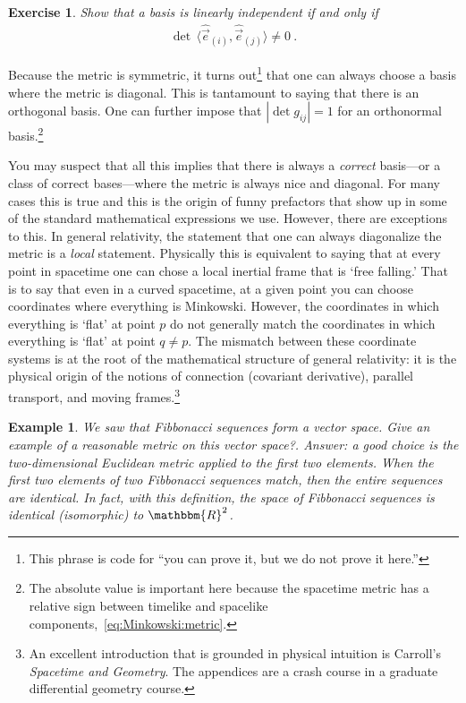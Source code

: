 \documentclass[
  11pt,
	colorful,
	raggedright,
]{tufte-style-thesis-flip}
\newtheorem{exercise}{Exercise}[section]
\newtheorem{example}{Example}[section]
\begin{document}
\begin{exercise}
Show that a basis is linearly independent if and only if
\begin{align}
\det\,\langle \hat{\vec{e}}_{(i)}, \hat{\vec{e}}_{(j)} \rangle \neq 0 \ .  
\end{align}
\end{exercise}
Because the metric is symmetric, it turns out\footnote{This phrase is code for ``you can prove it, but we do not prove it here.''} that one can always choose a basis where the metric is diagonal. This is tantamount to saying that there is an orthogonal basis. One can further impose that $|\det g_{ij}| = 1$ for an orthonormal basis.\footnote{The absolute value is important here because the  spacetime metric has a relative sign between timelike and spacelike components,~\eqref{eq:Minkowski:metric}.}

You may suspect that all this implies that there is always a \emph{correct} basis---or a class of correct bases---where the metric is always nice and diagonal. For many cases this is true and this is the origin of funny prefactors that show up in some of the standard mathematical expressions we use. However, there are exceptions to this. In general relativity, the statement that one can always diagonalize the metric is a \emph{local} statement. Physically this is equivalent to saying that at every point in spacetime one can chose a local inertial frame that is `free falling.' That is to say that even in a curved spacetime, at a given point you can choose coordinates where everything is Minkowski. However, the coordinates in which everything is `flat' at point $p$ do not generally match the coordinates in which everything is `flat' at point $q\neq p$. The mismatch between these coordinate systems is at the root of the mathematical structure of general relativity: it is the physical origin of the notions of connection (covariant derivative), parallel transport, and moving frames.\footnote{An excellent introduction that is grounded in physical intuition is Carroll's \emph{Spacetime and Geometry}. The appendices are a crash course in a graduate differential geometry course.}


\begin{example}
We saw that Fibbonacci sequences form a vector space. Give an example of a reasonable metric on this vector space?. Answer: a good choice is the two-dimensional Euclidean metric applied to the first two elements. When the first two elements of two Fibbonacci sequences match, then the entire sequences are identical. In fact, with this definition, the space of Fibbonacci sequences is identical (isomorphic) to $\mathbbm{R}^2$.  
\end{example}
\end{document}
